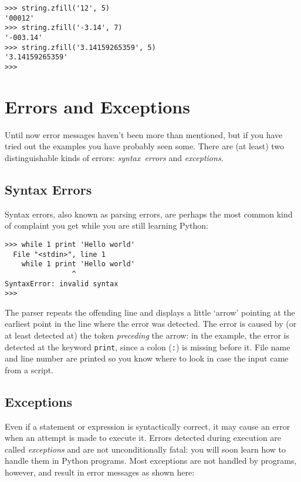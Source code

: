 \bcode\begin{verbatim}
>>> string.zfill('12', 5)
'00012'
>>> string.zfill('-3.14', 7)
'-003.14'
>>> string.zfill('3.14159265359', 5)
'3.14159265359'
>>>
\end{verbatim}\ecode


\chapter{Errors and Exceptions}

Until now error messages haven't been more than mentioned, but if you
have tried out the examples you have probably seen some.  There are
(at least) two distinguishable kinds of errors: {\em syntax\ errors}
and {\em exceptions}.

\section{Syntax Errors}

Syntax errors, also known as parsing errors, are perhaps the most common
kind of complaint you get while you are still learning Python:

\bcode\begin{verbatim}
>>> while 1 print 'Hello world'
  File "<stdin>", line 1
    while 1 print 'Hello world'
                ^
SyntaxError: invalid syntax
>>> 
\end{verbatim}\ecode
%
The parser repeats the offending line and displays a little `arrow'
pointing at the earliest point in the line where the error was detected.
The error is caused by (or at least detected at) the token
{\em preceding}
the arrow: in the example, the error is detected at the keyword
{\tt print}, since a colon ({\tt :}) is missing before it.
File name and line number are printed so you know where to look in case
the input came from a script.

\section{Exceptions}

Even if a statement or expression is syntactically correct, it may
cause an error when an attempt is made to execute it.
Errors detected during execution are called {\em exceptions} and are
not unconditionally fatal: you will soon learn how to handle them in
Python programs.  Most exceptions are not handled by programs,
however, and result in error messages as shown here:

